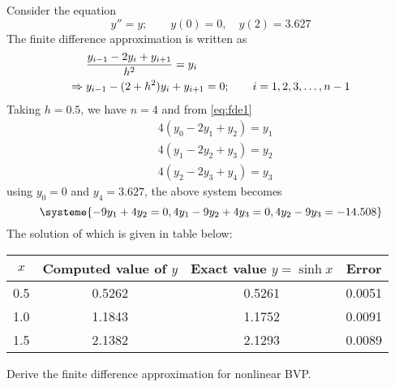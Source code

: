 \documentclass[../main-sheet.tex]{subfiles}
\begin{document}
\begin{ex}
    Consider the equation 
    \[
        y''=y;\qquad y(0)=0,\quad y(2)=3.627
    \]
    The finite difference approximation is written as
    \begin{align}
        &\frac{y_{i-1}-2y_i+y_{i+1}}{h^2}=y_i
        \label{eq:fde1}\\
        \Rightarrow\; & y_{i-1}-(2+h^2)y_i+y_{i+1}=0;\qquad i=1,2,3,\dots,n-1\notag
    \end{align}
    Taking \(h=0.5\), we have \(n=4\) and from \eqref{eq:fde1}
    \begin{align*}
        &4(y_0-2y_1+y_2)=y_1\\
        &4(y_1-2y_2+y_3)=y_2\\
        &4(y_2-2y_3+y_4)=y_3
    \end{align*}
    using \(y_0=0\) and \(y_4=3.627\), the above system becomes
    \[\systeme{
        -9y_1+4y_2=0,
        4y_1-9y_2+4y_3=0,
        4y_2-9y_3=-14.508
    }\]
    The solution of which is given in table below:
    \begin{table}
        \centering
        \begin{tabular}{cccc}
            \toprule
            \(x\)& Computed value of \(y\) & Exact value \(y=\sinh x\) & Error\\\midrule
            0.5 & 0.5262 & 0.5261 & 0.0051 \\
            1.0 & 1.1843 & 1.1752 & 0.0091 \\
            1.5 & 2.1382 & 2.1293 & 0.0089 \\ \bottomrule
        \end{tabular}
    \end{table}
\end{ex}
\begin{prob}[H.W.]
    Derive the finite difference approximation for nonlinear BVP.
\end{prob}
\end{document}
